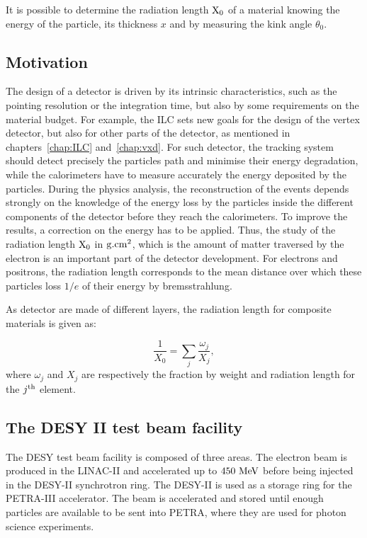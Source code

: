     It is possible to determine the radiation length $\rm{X_0}$ of a material knowing the energy of the particle, its thickness $x$ and by measuring the kink angle $\theta_0$.

    \subsection{Motivation}

    The design of a detector is driven by its intrinsic characteristics, such as the pointing resolution or the integration time, but also by some requirements on the material budget.
    For example, the \gls{ILC} sets new goals for the design of the vertex detector, but also for other parts of the detector, as mentioned in chapters~\ref{chap:ILC} and~\ref{chap:vxd}.
    For such detector, the tracking system should detect precisely the particles path and minimise their energy degradation, while the calorimeters have to measure accurately the energy deposited by the particles.
    During the physics analysis, the reconstruction of the events depends strongly on the knowledge of the energy loss by the particles inside the different components of the detector before they reach the calorimeters. 
    To improve the results, a correction on the energy has to be applied.
    Thus, the study of the radiation length $\rm{X_{0}}$ in $\rm{g.cm}^{2}$, which is the amount of matter traversed by the electron is an important part of the detector development.
    For electrons and positrons, the radiation length corresponds to the mean distance over which these particles loss $1/e$ of their energy by bremsstrahlung.

    As detector are made of different layers, the radiation length for composite materials is given as:

    \begin{equation}
      \frac{1}{X_{0}} = \sum_{j} \frac{\omega_{j}}{X_{j}},
    \end{equation}
   where $\omega_{j}$ and $X_{j}$ are respectively the fraction by weight and radiation length for the $j^{\rm{th}}$ element.

    \subsection{The DESY II test beam facility}

    The \gls{DESY} test beam facility \cite{DESYII} is composed of three areas.
    The electron beam is produced in the LINAC-II and accelerated up to $450~\rm{MeV}$ before being injected in the DESY-II synchrotron ring.
    The DESY-II is used as a storage ring for the PETRA-III accelerator. 
    The beam is accelerated and stored until enough particles are available to be sent into PETRA, where they are used for photon science experiments.
    
